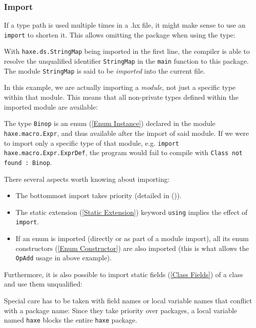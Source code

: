 \documentclass{article}
\newcommand{\type}[1]{\texttt{#1}}
\newcommand{\expr}[1]{\texttt{#1}}
\newcommand{\Fullref}[1]{\nameref{#1} (\Cref{#1})}
\newcommand{\tref}[2]{#1 (\ref{#2})}
\newcommand{\haxe}[2][]{%
}
\begin{document}
\subsubsection{Import}
\label{Import}

If a type path is used multiple times in a .hx file, it might make sense to use an \expr{import} to shorten it. This allows omitting the package when using the type:

\haxe{assets/Import.hx}

With \expr{haxe.ds.StringMap} being imported in the first line, the compiler is able to resolve the unqualified identifier \expr{StringMap} in the \expr{main} function to this package. The module \type{StringMap} is said to be \emph{imported} into the current file.

In this example, we are actually importing a \emph{module}, not just a specific type within that module. This means that all non-private types defined within the imported module are available:

\haxe{assets/Import2.hx}

The type \type{Binop} is an \tref{enum}{Enum Instance} declared in the module \type{haxe.macro.Expr}, and thus available after the import of said module. If we were to import only a specific type of that module, e.g. \expr{import haxe.macro.Expr.ExprDef}, the program would fail to compile with \expr{Class not found : Binop}.

There several aspects worth knowing about importing:

\begin{itemize}
	\item The bottommost import takes priority (detailed in \Fullref{Resolution Order}).
	\item The \tref{static extension}{Static Extension} keyword \expr{using} implies the effect of \expr{import}.
	\item If an enum is imported (directly or as part of a module import), all its \tref{enum constructors}{Enum Constructor} are also imported (this is what allows the \expr{OpAdd} usage in above example).
\end{itemize}

Furthermore, it is also possible to import \tref{static fields}{Class Fields} of a class and use them unqualified:

\haxe{assets/Import3.hx}


Special care has to be taken with field names or local variable names that conflict with a package name: Since they take priority over packages, a local variable named \expr{haxe} blocks the entire \expr{haxe} package.
\end{document}
